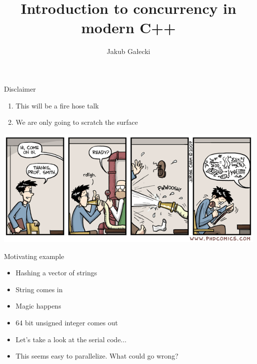 \documentclass{beamer}
\title{Introduction to concurrency in modern C++}
\date{\vspace{5pt}\formatdate{24}{1}{2022}}
\author{Jakub Gałecki}
\begin{document}
\maketitle


\begin{frame}{Disclaimer}
\begin{enumerate}
\item This will be a fire hose talk
\item We are only going to scratch the surface
\end{enumerate}
\includegraphics[width=\linewidth]{firehose.png}
\end{frame}

\begin{frame}{Motivating example}
\begin{itemize}
\item Hashing a vector of strings
\item String comes in
\item Magic happens
\item 64 bit unsigned integer comes out
\item Let's take a look at the serial code...
\item This seems easy to parallelize. What could go wrong?
\end{itemize}
\end{frame}
\end{document}
